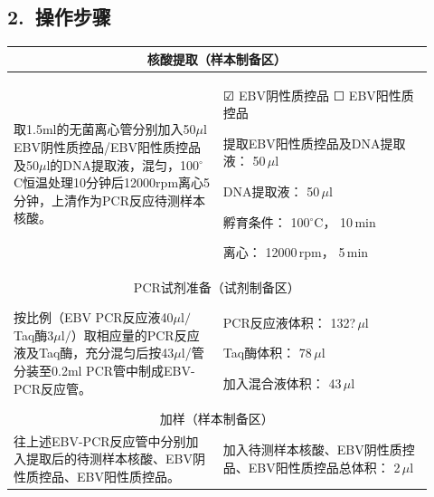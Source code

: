 \documentclass[UTF8,10pt,a4paper,fontset=fandol]{ctexart}
\newcommand{\fieldvalue}[1]{#1}
\newcommand{\handwritten}[1]{#1}
\newcommand{\checkboxfield}[1]{\ifstrequal{#1}{checked}{☑}{\ifstrequal{#1}{unclear}{?}{☐}}}
\begin{document}
\subsection{2.\ 操作步骤}

\begin{tabular}{|p{0.46\linewidth}|p{0.46\linewidth}|}
\hline
\multicolumn{2}{|c|}{核酸提取（样本制备区）} \\
\hline
取1.5ml的无菌离心管分别加入50$\mu$l EBV阴性质控品/EBV阳性质控品及50$\mu$l的DNA提取液，混匀，100$^\circ$C恒温处理10分钟后12000rpm离心5分钟，上清作为PCR反应待测样本核酸。 &
\fieldvalue{\handwritten{\checkboxfield{checked}}} EBV阴性质控品\quad
\fieldvalue{\checkboxfield{unchecked}} EBV阳性质控品

提取EBV阳性质控品及DNA提取液：
\fieldvalue{\handwritten{50}}\,$\mu$l

DNA提取液：
\fieldvalue{\handwritten{50}}\,$\mu$l

孵育条件：
\fieldvalue{\handwritten{100}}$^\circ$C，
\fieldvalue{\handwritten{10}}\,min

离心：
\fieldvalue{\handwritten{12000}}\,rpm，
\fieldvalue{\handwritten{5}}\,min
\\ \hline
\multicolumn{2}{|c|}{PCR试剂准备（试剂制备区）} \\
\hline
按比例（EBV PCR反应液40$\mu$l$/$Taq酶3$\mu$l$/$）取相应量的PCR反应液及Taq酶，充分混匀后按43$\mu$l/管分装至0.2ml PCR管中制成EBV-PCR反应管。 &
PCR反应液体积：
\fieldvalue{\handwritten{132?}}\,$\mu$l

Taq酶体积：
\fieldvalue{\handwritten{78}}\,$\mu$l

加入混合液体积：
\fieldvalue{\handwritten{43}}\,$\mu$l
\\ \hline
\multicolumn{2}{|c|}{加样（样本制备区）} \\
\hline
往上述EBV-PCR反应管中分别加入提取后的待测样本核酸、EBV阴性质控品、EBV阳性质控品。 &
加入待测样本核酸、EBV阴性质控品、EBV阳性质控品总体积：
\fieldvalue{\handwritten{2}}\,$\mu$l
\\ \hline
\end{tabular}
\end{document}
